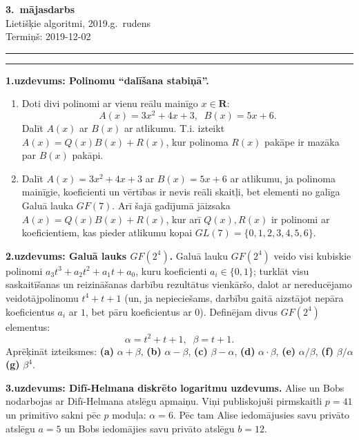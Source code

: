 \documentclass[a4paper,12pt]{article}
\begin{document}
\thispagestyle{empty}

\begin{center}
{\bf\Huge 3.\ mājasdarbs} \\[5pt]
Lietišķie algoritmi, 2019.g.\ rudens\\
Termiņš: 2019-12-02
\end{center}

\hrule
\vspace{2pt}
\hrule
\vspace{12pt}




\vspace{6pt}
{\bf 1.uzdevums: Polinomu ``dalīšana stabiņā''.} 
\begin{enumerate}[label=(\alph*)]
\item Doti divi polinomi ar vienu reālu mainīgo $x \in \mathbf{R}$: 
$$A(x) = 3x^2 + 4x + 3,\;\;B(x) = 5x + 6.$$
Dalīt $A(x)$ ar $B(x)$ ar atlikumu. T.i. izteikt $A(x) = Q(x)B(x) + R(x)$, 
kur polinoma $R(x)$ pakāpe ir mazāka par $B(x)$ pakāpi.
\item Dalīt $A(x) = 3x^2 + 4x + 3$ ar $B(x) = 5x+6$ ar atlikumu, ja
polinoma mainīgie, koeficienti un vērtības ir nevis reāli skaitļi, bet
elementi no galīga Galuā lauka $GF(7)$. Arī šajā 
gadījumā jāizsaka $A(x) = Q(x)B(x) + R(x)$, kur arī $Q(x),R(x)$ ir polinomi 
ar koeficientiem, kas pieder atlikumu kopai $GL(7) = \{ 0,1,2,3,4,5,6 \}$.
\end{enumerate}

\vspace{6pt}
{\bf 2.uzdevums: Galuā lauks $GF(2^4)$.}
Galuā lauku $GF(2^4)$ veido visi kubiskie polinomi
$a_3t^3 + a_2t^2 + a_1t + a_0$, kuru 
koeficienti $a_i \in \{ 0,1 \}$; turklāt visu saskaitīšanas un 
reizināšanas darbību rezultātus vienkāršo, dalot ar nereducējamo
veidotājpolinomu $t^4 + t + 1$ (un, ja nepieciešams, darbību gaitā aizstājot 
nepāra koeficientus $a_i$ ar $1$, bet pāru koeficientus ar $0$). Definējam 
divus $GF(2^4)$ elementus:
$$\alpha = t^2 + t + 1,\;\;\beta=t+1.$$
Aprēķināt izteiksmes: {\bf (a)} $\alpha + \beta$, 
{\bf (b)} $\alpha - \beta$,
{\bf (c)} $\beta - \alpha$,
{\bf (d)} $\alpha \cdot \beta$,
{\bf (e)} $\alpha / \beta$,
{\bf (f)} $\beta / \alpha$
{\bf (g)} $\beta^4$.

\vspace{6pt}
{\bf 3.uzdevums: Difī-Helmana diskrēto logaritmu uzdevums.} 
Alise un Bobs nodarbojas ar Difī-Helmana atslēgu apmaiņu. 
Viņi publiskojuši pirmskaitli $p=41$ un primitīvo sakni 
pēc $p$ moduļa: $\alpha = 6$. Pēc tam Alise iedomājusies 
savu privāto atslēgu $a = 5$ un Bobs iedomājies savu privāto 
atslēgu $b = 12$. 
\end{document}
